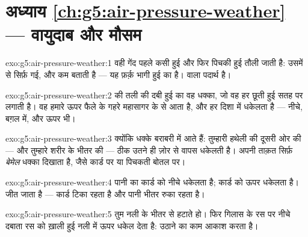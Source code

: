 \section*{अध्याय \ref{ch:g5:air-pressure-weather} --- वायुदाब और मौसम}

\begin{solution}{exo:g5:air-pressure-weather:1}
वही गेंद पहले कसी हुई और फिर पिचकी हुई तौली जाती है: उसमें से सिर्फ़
 गई, और  कम बताती है --- यह फ़र्क़ भागी हुई  का  है। 
 वाला पदार्थ है।
\end{solution}

\begin{solution}{exo:g5:air-pressure-weather:2}
 की तली की दबी हुई  का वह धक्का, जो वह हर छूती हुई सतह पर
लगाती है। वह हमारे ऊपर फैले  के गहरे महासागर के  से आता है, और
हर दिशा में धकेलता है --- नीचे, बग़ल में, और ऊपर भी।
\end{solution}

\begin{solution}{exo:g5:air-pressure-weather:3}
क्योंकि धक्के बराबरी में आते हैं: तुम्हारी हथेली की दूसरी ओर की ---
और तुम्हारे शरीर के भीतर की ---  ठीक उतने ही ज़ोर से वापस धकेलती
है। अपनी ताक़त सिर्फ़ \emph{बेमेल} धक्का दिखाता है, जैसे कार्ड पर या
पिचकती बोतल पर।
\end{solution}

\begin{solution}{exo:g5:air-pressure-weather:4}
पानी का  कार्ड को नीचे धकेलता है;  कार्ड को ऊपर धकेलता है।
 जीत जाता है --- कार्ड टिका रहता है और पानी भीतर रुका रहता है।
\end{solution}

\begin{solution}{exo:g5:air-pressure-weather:5}
तुम नली के भीतर से \emph{} हटाते हो। फिर गिलास के रस पर नीचे दबाता
 रस को ख़ाली हुई नली में ऊपर धकेल देता है: उठाने का काम आकाश
करता है।
\end{solution}

